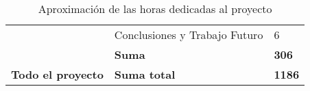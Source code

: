 \begin{table}[]
\begin{tabular}{|c|l|l|}
                                        & Conclusiones y Trabajo Futuro                   & 6                                             \\ \cline{2-3} 
                                        & \textbf{Suma}                                   & \textbf{306}                                  \\ \hline
\textbf{Todo el proyecto}               & \textbf{Suma total}                             & \textbf{1186}                                 \\ \hline
\end{tabular}

\caption{Aproximación de las horas dedicadas al proyecto}
\label{horas}
\end{table}
